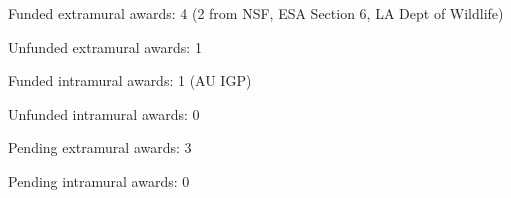 \begin{veryTightItemize}
    \item Funded extramural awards: 4 (2 from NSF, ESA Section 6, LA Dept of Wildlife)
    \item Unfunded extramural awards: 1
    \item Funded intramural awards: 1 (AU IGP)
    \item Unfunded intramural awards: 0
    \item Pending extramural awards: 3
    \item Pending intramural awards: 0
\end{veryTightItemize}
